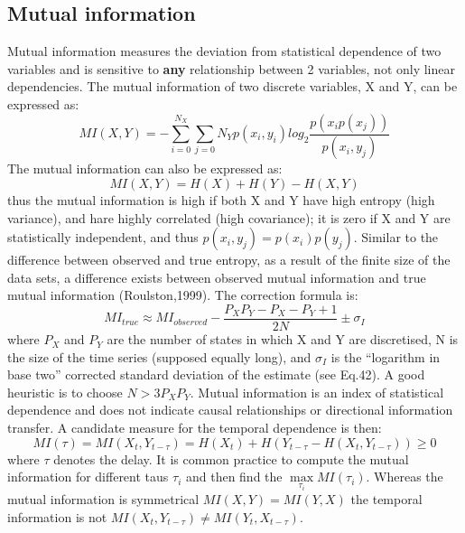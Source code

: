 \subsection{Mutual information}
Mutual information measures the deviation from statistical dependence of two
variables and is sensitive to \textbf{any} relationship between 2 variables,
not only linear dependencies.
The mutual information of two discrete variables, X and Y, can be expressed as:
\begin{equation}
MI(X,Y)=-\sum_{i=0}^{N_{X}} \sum_{j=0}{N_{Y}} p(x_{i},y_{i}) log_2 \frac {p(x_{i}p(x_{j}))}{p(x_{i},y_{j})}
\end{equation}
The mutual information can also be expressed as:
\begin{equation}
MI(X,Y)=H(X)+H(Y)-H(X,Y)
\end{equation}
thus the mutual information is high if both X and Y have high entropy (high variance),
and hare highly correlated (high covariance); it is zero if X and Y are statistically independent,
and thus $p(x_i,y_j)=p(x_i)p(y_j)$.
Similar to the difference between observed and true entropy, as a result of the
finite size of the data sets, a difference exists between observed mutual information
and true mutual information (Roulston,1999).
The correction formula is:
\begin{equation}
MI_{true}\approx MI_{observed} - \frac{P_{X}P_{Y}-P_{X}-P_{Y}+1}{2 N} \pm \sigma_{I}
\end{equation}
where $P_{X}$ and $P_{Y}$ are the number of states in which X and Y are discretised,
N is the size of the time series (supposed equally long), and $\sigma_{I}$ is the
``logarithm in base two'' corrected standard deviation of the estimate
(see \citep{Roulston1999:Estimation} Eq.42).
A good heuristic is to choose $N>3 P_{X} P_{Y}$.
Mutual information is an index of statistical dependence and does not indicate causal
relationships or directional information transfer.
A candidate measure for the temporal dependence is then:
\begin{equation}
MI(\tau)=MI(X_{t},Y_{t-\tau})=H(X_{t})+H(Y_{t-\tau}-H(X_{t},Y_{t-\tau})) \geqslant 0
\end{equation}
where $\tau$ denotes the delay. It is common practice to compute the mutual
information for different taus $\tau_{i}$ and then find the $\max\limits_{\tau_i} MI(\tau_i)$.
Whereas the mutual information is symmetrical $MI(X,Y)=MI(Y,X)$ the temporal
information is not $MI(X_{t},Y_{t-\tau}) \neq MI(Y_{t},X_{t-\tau})$.

